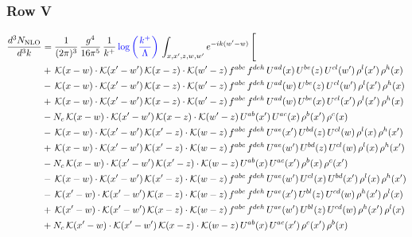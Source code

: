 \documentclass[9pt]{article}
\numberwithin{equation}{section}
\begin{document}
\subsubsection{Row V}
\begin{align}
\frac{d^{3}N_{\mathrm{NLO}}}{d^{3}k} & = \frac{1}{(2\pi)^{3}}\,\frac{g^{4}}{16\pi^{5}}\,\frac{1}{k^{+}}\,{\color{blue}\log{\left(\frac{k^{+}}{\Lambda}\right)}}\,\int_{x,x',z,w,w'}e^{-ik(w'-w)}\,\Bigg[\notag\\ &  +\,\mathcal{K}(x-w)\cdot\mathcal{K}(x'-w')\,\mathcal{K}(x-z)\cdot\mathcal{K}(w'-z)\,f^{abc}\,f^{deh}\,U^{ad}(x)\,U^{be}(z)\,U^{cl}(w')\,\rho^{l}(x')\,\rho^{h}(x)\notag\\
& -\,\mathcal{K}(x-w)\cdot\mathcal{K}(x'-w')\,\mathcal{K}(x-z)\cdot\mathcal{K}(w'-z)\,f^{abc}\,f^{deh}\,U^{ad}(w)\,U^{be}(z)\,U^{cl}(w')\,\rho^{l}(x')\,\rho^{h}(x)\notag\\
& +\,\mathcal{K}(x-w)\cdot\mathcal{K}(x'-w')\,\mathcal{K}(x-z)\cdot\mathcal{K}(w'-z)\,f^{abc}\,f^{deh}\,U^{ad}(w)\,U^{be}(x)\,U^{cl}(x')\,\rho^{l}(x')\,\rho^{h}(x)\notag\\
& -N_{c}\,\mathcal{K}(x-w)\cdot\mathcal{K}(x'-w')\,\mathcal{K}(x-z)\cdot\mathcal{K}(w'-z)\,U^{ab}(x')\,U^{ac}(x)\,\rho^{b}(x')\,\rho^{c}(x)\notag\\
& -\,\mathcal{K}(x-w)\cdot\mathcal{K}(x'-w')\,\mathcal{K}(x'-z)\cdot\mathcal{K}(w-z)\,f^{abc}\,f^{deh}\,U^{ae}(x')\,U^{bd}(z)\,U^{cl}(w)\,\rho^{l}(x)\,\rho^{h}(x')\notag\\
& +\,\mathcal{K}(x-w)\cdot\mathcal{K}(x'-w')\,\mathcal{K}(x'-z)\cdot\mathcal{K}(w-z)\,f^{abc}\,f^{deh}\,U^{ae}(w')\,U^{bd}(z)\,U^{cl}(w)\,\rho^{l}(x)\,\rho^{h}(x')\notag\\
& -N_{c}\,\mathcal{K}(x-w)\cdot\mathcal{K}(x'-w')\,\mathcal{K}(x'-z)\cdot\mathcal{K}(w-z)\,U^{ab}(x)\,U^{ac}(x')\,\rho^{b}(x)\,\rho^{c}(x')\notag\\
& -\,\mathcal{K}(x-w)\cdot\mathcal{K}(x'-w')\,\mathcal{K}(x'-z)\cdot\mathcal{K}(w-z)\,f^{abc}\,f^{deh}\,U^{ae}(w')\,U^{cl}(x)\,U^{bd}(x')\,\rho^{l}(x)\,\rho^{h}(x')\notag\\
& -\,\mathcal{K}(x'-w)\cdot\mathcal{K}(x'-w')\,\mathcal{K}(x-z)\cdot\mathcal{K}(w-z)\,f^{abc}\,f^{deh}\,U^{ae}(x')\,U^{bl}(z)\,U^{cd}(w)\,\rho^{h}(x')\,\rho^{l}(x)\notag\\
& +\,\mathcal{K}(x'-w)\cdot\mathcal{K}(x'-w')\,\mathcal{K}(x-z)\cdot\mathcal{K}(w-z)\,f^{abc}\,f^{deh}\,U^{ae}(w')\,U^{bl}(z)\,U^{cd}(w)\,\rho^{h}(x')\,\rho^{l}(x)\notag\\
& +N_{c}\,\mathcal{K}(x'-w)\cdot\mathcal{K}(x'-w')\,\mathcal{K}(x-z)\cdot\mathcal{K}(w-z)\,U^{ab}(x)\,U^{ac}(x')\,\rho^{c}(x')\,\rho^{b}(x)\notag\\

\end{align}
\end{document}
